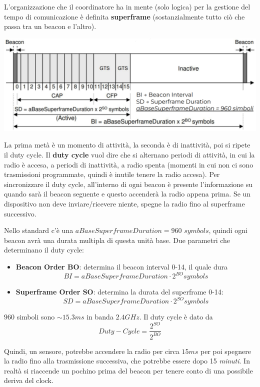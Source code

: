 L'organizzazione che il coordinatore ha in mente (solo logica) per la gestione del tempo di comunicazione è definita \textbf{superframe} (sostanzialmente tutto ciò che passa tra un beacon e l'altro).
\begin{center}
	\includegraphics[width=0.98\linewidth]{img/wpan/zsuperframe}
\end{center}
La prima metà è un momento di attività, la seconda è di inattività, poi si ripete il duty cycle. Il \textbf{duty cycle} vuol dire che si alternano periodi di attività, in cui la radio è accesa, a periodi di inattività, a radio spenta (momenti in cui non ci sono trasmissioni programmate, quindi è inutile tenere la radio accesa). Per sincronizzare il duty cycle, all'interno di ogni beacon è presente l'informazione su quando sarà il beacon seguente e questo accenderà la radio appena prima.
Se un dispositivo non deve inviare/ricevere niente, spegne la radio fino al superframe successivo.

Nello standard c'è una $aBaseSuperframeDuration = 960$ $symbols$, quindi ogni beacon avrà una durata multipla di questa unità base. Due parametri che determinano il duty cycle: 
\begin{itemize}
	\item \textbf{Beacon Order BO}: determina il beacon interval 0-14, il quale dura
	$$ BI = aBaseSuperframeDuration \cdot 2^{BO} symbols $$
	\item \textbf{Superframe Order SO}: determina la durata del superframe 0-14: 
	$$ SD = aBaseSuperframeDuration \cdot 2^{SO} symbols $$
\end{itemize}
$960$ simboli sono $\sim 15.3 ms$ in banda $2.4 GHz$. Il duty cycle è dato da 
$$ Duty-Cycle = \frac{2^{SO}}{2^{BO}} $$

Quindi, un sensore, potrebbe accendere la radio per circa $15ms$ per poi spegnere la radio fino alla trasmissione successiva, che potrebbe essere dopo 15 \textit{minuti}. In realtà si riaccende un pochino prima del beacon per tenere conto di una possibile deriva del clock.

